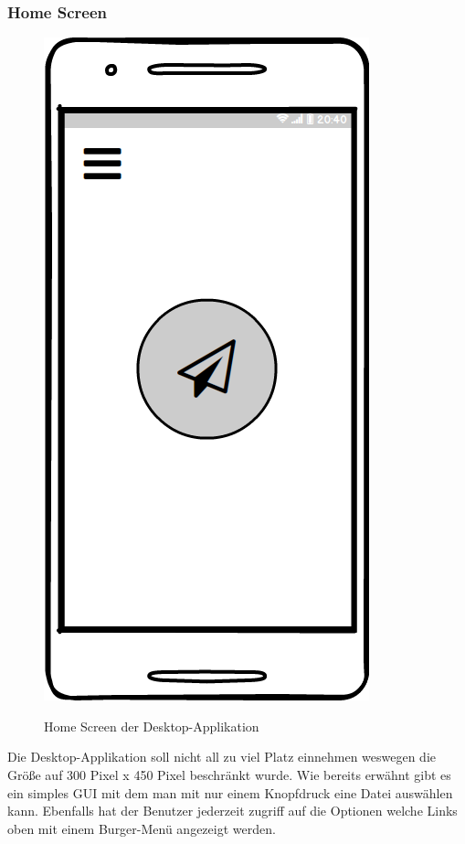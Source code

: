\subsubsection{Home Screen}
\begin{figure}[H]
	\centering
	\includegraphics[width=.5\linewidth]{pictures/Mobile/Home.png}\
	\caption{Home Screen der Desktop-Applikation}
\end{figure}
Die Desktop-Applikation soll nicht all zu viel Platz einnehmen weswegen die Größe auf 300 Pixel x 450 Pixel beschränkt wurde. Wie bereits erwähnt gibt es ein simples GUI mit dem man mit nur einem Knopfdruck eine Datei auswählen kann. Ebenfalls hat der Benutzer jederzeit zugriff auf die Optionen welche Links oben mit einem Burger-Menü angezeigt werden.
